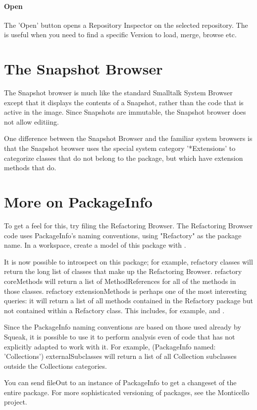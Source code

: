 \documentclass[a4paper,10pt,twoside]{book}
\begin{document}
\paragraph{Open}

The 'Open' button opens a Repository Inspector on the selected repository. The is useful when you need to find a specific Version to load, merge, browse etc.

\section{The Snapshot Browser}

The Snapshot browser is much like the standard Smalltalk System Browser except that it displays the contents of a Snapshot, rather than the code that is active in the image. Since Snapshots are immutable, the Snapshot browser does not allow editiing.

One difference between the Snapshot Browser and the familiar system browsers is that the Snapshot browser uses the special system category '*Extensions' to categorize classes that do not belong to the package, but which have extension methods that do.

\section{More on PackageInfo}
To get a feel for this, try filing the Refactoring Browser. The Refactoring Browser code uses PackageInfo's naming conventions, using "Refactory" as the package name. In a workspace, create a model of this package with  . 

It is now possible to introspect on this package; for example, refactory classes will return the long list of classes that make up the Refactoring Browser. refactory coreMethods will return a list of MethodReferences for all of the methods in those classes. refactory extensionMethods is perhaps one of the most interesting queries: it will return a list of all methods contained in the Refactory package but not contained within a Refactory class. This includes, for example,  and .

Since the PackageInfo naming conventions are based on those used already by Squeak, it is possible to use it to perform analysis even of code that has not explicitly adapted to work with it. For example, (PackageInfo named: 'Collections') externalSubclasses will return a list of all Collection subclasses outside the Collections categories.

You can send fileOut to an instance of PackageInfo to get a changeset of the entire package. For more sophisticated versioning of packages, see the Monticello project.


\ifx\wholebook\relax\else
   
   
\end{document}
